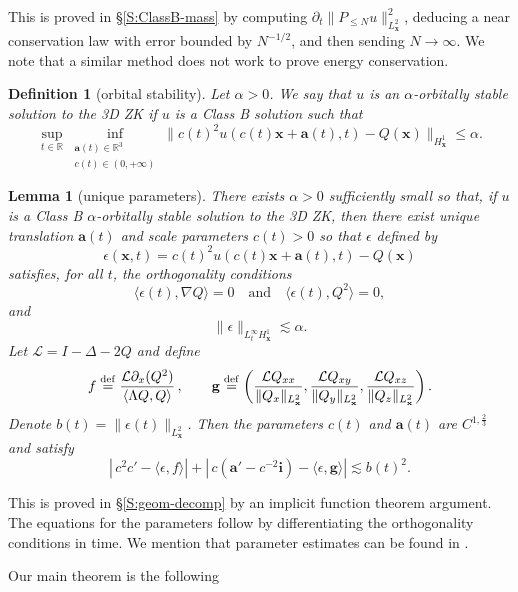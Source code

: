 \documentclass[12pt,letterpaper]{amsart}
\newcommand{\la}{\langle}
\newcommand{\ra}{\rangle}
\newcommand{\defeq}{\stackrel{\rm{def}}{=}}
\newtheorem{definition}[theorem]{Definition}
\newtheorem{lemma}[theorem]{Lemma}
\theoremstyle{remark}
\numberwithin{equation}{section}
\numberwithin{theorem}{section}
\numberwithin{table}{section}
\begin{document}
This is proved in \S\ref{S:ClassB-mass} by computing $\partial_t \| P_{\leq N}u\|_{L_{\mathbf{x}}^2}^2$, deducing a near conservation law with error bounded by $N^{-1/2}$, and then sending $N\to \infty$.  We note that a similar method does not work to prove energy conservation.

\begin{definition}[orbital stability]
\label{D:orb-stab}
Let $\alpha>0$.  We say that $u$ is an \emph{$\alpha$-orbitally stable} solution to the 3D ZK if $u$ is a Class B solution such that 
$$
\sup_{t\in \mathbb{R}}  \inf_{\substack{\mathbf{a}(t) \in \mathbb{R}^3 \\ c(t) \in (0,+\infty)}} \| c(t)^2 u(c(t)\mathbf{x}+\mathbf{a}(t), t) -Q( \mathbf{x}) \|_{H_{\mathbf{x}}^1} \leq \alpha.
$$
\end{definition}

\begin{lemma}[unique parameters]
\label{L:geom-decomp}
There exists $\alpha>0$ sufficiently small so that, if $u$ is a Class B $\alpha$-orbitally stable solution to the 3D ZK, then there exist \emph{unique} translation $\mathbf{a}(t)$ and scale parameters $c(t)>0$ so that $\epsilon$ defined by
$$\epsilon(\mathbf{x},t) = c(t)^2u(c(t)\mathbf{x}+\mathbf{a}(t),t) - Q(\mathbf{x})$$
satisfies, for all $t$, the orthogonality conditions
$$
\la \epsilon(t), \nabla Q \ra =0 \quad \mbox{and} \quad \la \epsilon(t), Q^2 \ra =0,
$$
and
$$
\| \epsilon \|_{L_t^\infty H_{\mathbf{x}}^1} \lesssim \alpha.
$$
Let $\mathcal L = I-\Delta -2Q$ and define
$$
f\defeq \frac{\mathcal{L}\partial_x (Q^2)}{\la \Lambda Q, Q\ra} \,, \qquad \mathbf{g} \defeq \left(  \frac{ \mathcal{L}Q_{xx} }{ \|Q_x\|_{L_{\mathbf{x}}^2}}, \frac{\mathcal{L}Q_{xy}}{ \|Q_y\|_{L_{\mathbf{x}}^2}}, \frac{\mathcal{L}Q_{xz} }{ \|Q_z\|_{L_{\mathbf{x}}^2}}\right).
$$
Denote $b(t) = \|\epsilon(t)\|_{L_{\mathbf{x}}^2}$.  
Then the parameters  $c(t)$ and $\mathbf{a}(t)$ are $C^{1,\frac23}$ and satisfy
$$
|\,c^2c' - \la \epsilon, f\ra | + |\, c(\mathbf{a}' - c^{-2} \mathbf{i}) - \la \epsilon, \mathbf{g}\ra | \lesssim b(t)^2.
$$
\end{lemma}

This is proved in \S\ref{S:geom-decomp} by an implicit function theorem argument.  The equations for the parameters follow by differentiating the orthogonality conditions in time.
We mention that parameter estimates can be found in \cite{FHRY, FHR1,FHR2,FHR3, FHR4}.

Our main theorem is the following
\end{document}
